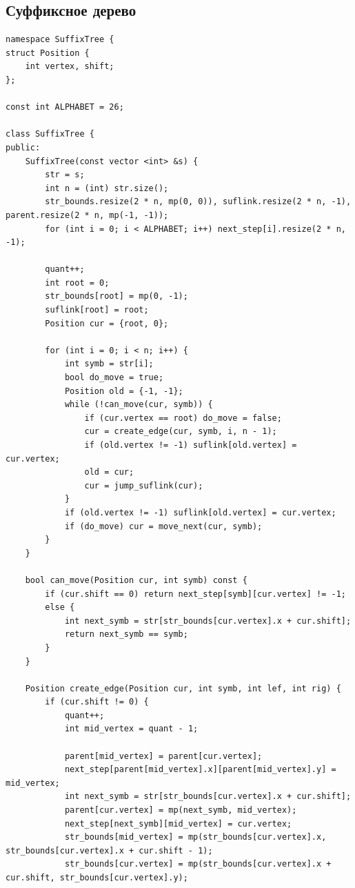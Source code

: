 \documentclass[10pt, portrait,letterpaper]{article}
\begin{document}
\subsection{Суффиксное дерево}

\begin{verbatim}
namespace SuffixTree {
struct Position {
    int vertex, shift; 	
};

const int ALPHABET = 26;

class SuffixTree {
public: 	 	
    SuffixTree(const vector <int> &s) {
        str = s;
        int n = (int) str.size();
        str_bounds.resize(2 * n, mp(0, 0)), suflink.resize(2 * n, -1), parent.resize(2 * n, mp(-1, -1));
        for (int i = 0; i < ALPHABET; i++) next_step[i].resize(2 * n, -1);
        
        quant++;
        int root = 0;
        str_bounds[root] = mp(0, -1);
        suflink[root] = root;
        Position cur = {root, 0};

        for (int i = 0; i < n; i++) {
            int symb = str[i];
            bool do_move = true;
            Position old = {-1, -1};
            while (!can_move(cur, symb)) {
                if (cur.vertex == root) do_move = false;
                cur = create_edge(cur, symb, i, n - 1);
                if (old.vertex != -1) suflink[old.vertex] = cur.vertex;
                old = cur;
                cur = jump_suflink(cur);
            }
            if (old.vertex != -1) suflink[old.vertex] = cur.vertex;
            if (do_move) cur = move_next(cur, symb);
        }
    }

    bool can_move(Position cur, int symb) const {
        if (cur.shift == 0) return next_step[symb][cur.vertex] != -1;
        else {
            int next_symb = str[str_bounds[cur.vertex].x + cur.shift];
            return next_symb == symb;
        }
    }

    Position create_edge(Position cur, int symb, int lef, int rig) {
        if (cur.shift != 0) {
            quant++;
            int mid_vertex = quant - 1;
            
            parent[mid_vertex] = parent[cur.vertex];
            next_step[parent[mid_vertex].x][parent[mid_vertex].y] = mid_vertex;
            int next_symb = str[str_bounds[cur.vertex].x + cur.shift];
            parent[cur.vertex] = mp(next_symb, mid_vertex);
            next_step[next_symb][mid_vertex] = cur.vertex;
            str_bounds[mid_vertex] = mp(str_bounds[cur.vertex].x, str_bounds[cur.vertex].x + cur.shift - 1);
            str_bounds[cur.vertex] = mp(str_bounds[cur.vertex].x + cur.shift, str_bounds[cur.vertex].y);


\end{verbatim}
\end{document}
